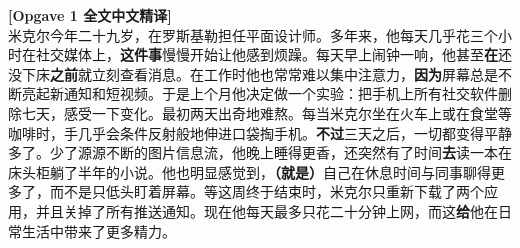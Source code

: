 \begin{transbox}
\small
\textbf{\color{NCDTeal}[Opgave 1 全文中文精译]}\\
米克尔今年二十九岁，在罗斯基勒担任平面设计师。多年来，他每天几乎花三个小时在社交媒体上，\textbf{这件事}慢慢开始让他感到烦躁。每天早上闹钟一响，他甚至\textbf{在}还没下床\textbf{之前}就立刻查看消息。在工作时他也常常难以集中注意力，\textbf{因为}屏幕总是不断亮起新通知和短视频。于是上个月他决定做一个实验：把手机上所有社交软件删除七天，感受一下变化。最初两天出奇地难熬。每当米克尔坐在火车上或在食堂等咖啡时，手几乎会条件反射般地伸进口袋掏手机。\textbf{不过}三天之后，一切都变得平静多了。少了源源不断的图片信息流，他晚上睡得更香，还突然有了时间\textbf{去}读一本在床头柜躺了半年的小说。他也明显感觉到，\textbf{（就是）}自己在休息时间与同事聊得更多了，而不是只低头盯着屏幕。等这周终于结束时，米克尔只重新下载了两个应用，并且关掉了所有推送通知。现在他每天最多只花二十分钟上网，而这\textbf{给}他在日常生活中带来了更多精力。
\end{transbox}


